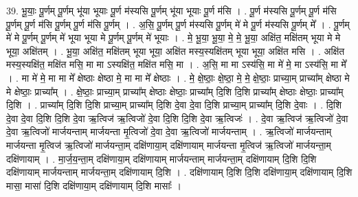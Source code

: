 \documentclass[17pt]{extarticle}
\begin{document}
39. भू॒याः॒ पू॒र्णम् पू॒र्णम् भू॑या भूयाः पू॒र्ण म॑स्यसि पू॒र्णम् भू॑या भूयाः पू॒र्ण म॑सि । . पू॒र्ण म॑स्यसि पू॒र्णम् पू॒र्ण म॑सि पू॒र्णम् पू॒र्ण म॑सि पू॒र्णम् पू॒र्ण म॑सि पू॒र्णम् । . अ॒सि॒ पू॒र्णम् पू॒र्ण म॑स्यसि पू॒र्णम् मे॑ मे पू॒र्ण म॑स्यसि पू॒र्णम् मे᳚ । . पू॒र्णम् मे॑ मे पू॒र्णम् पू॒र्णम् मे॑ भूया भूया मे पू॒र्णम् पू॒र्णम् मे॑ भूयाः । . मे॒ भू॒या॒ भू॒या॒ मे॒ मे॒ भू॒या॒ अक्षि॑त॒ मक्षि॑तम् भूया मे मे भूया॒ अक्षि॑तम् । . भू॒या॒ अक्षि॑त॒ मक्षि॑तम् भूया भूया॒ अक्षि॑त मस्य॒स्यक्षि॑तम् भूया भूया॒ अक्षि॑त मसि । . अक्षि॑त मस्य॒स्यक्षि॑त॒ मक्षि॑त मसि॒ मा मा ऽस्यक्षि॑त॒ मक्षि॑त मसि॒ मा । . अ॒सि॒ मा मा ऽस्य॑सि॒ मा मे॑ मे॒ मा ऽस्य॑सि॒ मा मे᳚ । . मा मे॑ मे॒ मा मा मे᳚ क्षेष्ठाः क्षेष्ठा मे॒ मा मा मे᳚ क्षेष्ठाः । . मे॒ क्षे॒ष्ठाः॒ क्षे॒ष्ठा॒ मे॒ मे॒ क्षे॒ष्ठाः॒ प्राच्या॒म् प्राच्या᳚म् क्षेष्ठा मे मे क्षेष्ठाः॒ प्राच्या᳚म् । . क्षे॒ष्ठाः॒ प्राच्या॒म् प्राच्या᳚म् क्षेष्ठाः क्षेष्ठाः॒ प्राच्या᳚म् दि॒शि दि॒शि प्राच्या᳚म् क्षेष्ठाः क्षेष्ठाः॒ प्राच्या᳚म् दि॒शि । . प्राच्या᳚म् दि॒शि दि॒शि प्राच्या॒म् प्राच्या᳚म् दि॒शि दे॒वा दे॒वा दि॒शि प्राच्या॒म् प्राच्या᳚म् दि॒शि दे॒वाः । . दि॒शि दे॒वा दे॒वा दि॒शि दि॒शि दे॒वा ऋ॒त्विज॑ ऋ॒त्विजो॑ दे॒वा दि॒शि दि॒शि दे॒वा ऋ॒त्विजः॑ । . दे॒वा ऋ॒त्विज॑ ऋ॒त्विजो॑ दे॒वा दे॒वा ऋ॒त्विजो॑ मार्जयन्ताम् मार्जयन्ता मृ॒त्विजो॑ दे॒वा दे॒वा ऋ॒त्विजो॑ मार्जयन्ताम् । . ऋ॒त्विजो॑ मार्जयन्ताम् मार्जयन्ता मृ॒त्विज॑ ऋ॒त्विजो॑ मार्जयन्ता॒म् दक्षि॑णाया॒म् दक्षि॑णायाम् मार्जयन्ता मृ॒त्विज॑ ऋ॒त्विजो॑ मार्जयन्ता॒म् दक्षि॑णायाम् । . मा॒र्ज॒य॒न्ता॒म् दक्षि॑णाया॒म् दक्षि॑णायाम् मार्जयन्ताम् मार्जयन्ता॒म् दक्षि॑णायाम् दि॒शि दि॒शि दक्षि॑णायाम् मार्जयन्ताम् मार्जयन्ता॒म् दक्षि॑णायाम् दि॒शि । . दक्षि॑णायाम् दि॒शि दि॒शि दक्षि॑णाया॒म् दक्षि॑णायाम् दि॒शि मासा॒ मासा॑ दि॒शि दक्षि॑णाया॒म् दक्षि॑णायाम् दि॒शि मासाः᳚ । \newline
\pagebreak
{}
\end{document}
